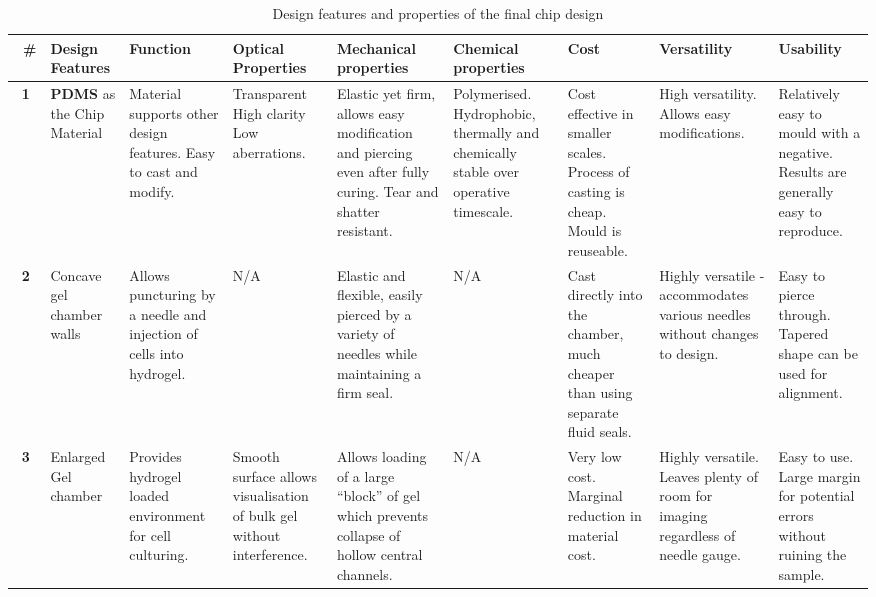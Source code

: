 \documentclass[letterpaper,12pt]{article}
\begin{document}


\begin{table}
    \footnotesize
    \setlength\tabcolsep{1pt}
    \centering
    \captionsetup{justification=centering}
    \caption{Design features and properties of the final chip design}\label{tab:chip_design}
    \begin{tabularx}{\columnwidth}{|c|
        >{\centering\arraybackslash}m{1.5cm}|>{\centering\arraybackslash}m{2.3cm}|
        >{\centering\arraybackslash}m{2cm}|>{\centering\arraybackslash}m{2.7cm}|
        >{\centering\arraybackslash}m{2.3cm}|>{\centering\arraybackslash}m{2.5cm}|
        >{\centering\arraybackslash}m{2.6cm}|>{\centering\arraybackslash}m{2.5cm}|}
\hline
\
\textbf{\#}  & \textbf{Design Features}  & \textbf{Function}  & \textbf{Optical Properties}  & \textbf{Mechanical properties}  & \textbf{Chemical properties}  & \textbf{Cost}  & \textbf{Versatility}  & \textbf{Usability}  \\
\hline
\hline
\textbf{1}  & \textbf{PDMS} as the Chip Material  & Material supports other design features. Easy to cast and modify.  & Transparent High clarity Low aberrations.  & Elastic yet firm, allows easy modification and piercing even after fully curing. Tear and shatter resistant.  & Polymerised. Hydrophobic, thermally and chemically stable over operative timescale.  & Cost effective in smaller scales. Process of casting is cheap. Mould is reuseable.  & High versatility. Allows easy modifications.  & Relatively easy to mould with a negative. Results are generally easy to reproduce.  \\
\hline
\textbf{2}  & Concave gel chamber walls  & Allows puncturing by a needle and injection of cells into hydrogel.  & N/A  & Elastic and flexible, easily pierced by a variety of needles while maintaining a firm seal.  & N/A  & Cast directly into the chamber, much cheaper than using separate fluid seals.  & Highly versatile - accommodates various needles without changes to design.  & Easy to pierce through. Tapered shape can be used for alignment.  \\
\hline
\textbf{3}  & Enlarged Gel chamber  & Provides hydrogel loaded environment for cell culturing.  & Smooth surface allows visualisation of bulk gel without interference.  & Allows loading of a large “block” of gel which prevents collapse of hollow central channels.  & N/A  & Very low cost. Marginal reduction in material cost.  & Highly versatile. Leaves plenty of room for imaging regardless of needle gauge.  & Easy to use. Large margin for potential errors without ruining the sample.  \\

\end{tabularx}
\end{table}
\end{document}
